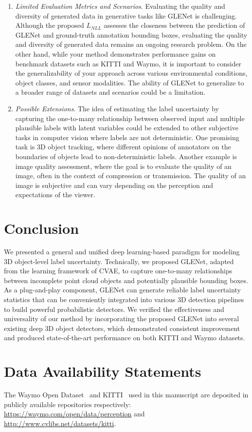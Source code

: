 \documentclass[twocolumn]{svjour3}
\begin{document}
{\begin{enumerate}[label=(\arabic*)]
	\item \textit{Limited Evaluation Metrics and Scenarios}. 
	Evaluating the quality and diversity of generated data in generative tasks like GLENet is challenging. 
Although the proposed $L_{NLL}$ assesses the closeness between the prediction of GLENet and ground-truth annotation bounding boxes, evaluating the quality and diversity of generated data remains an ongoing research problem.
	On the other hand, while your method demonstrates performance gains on benchmark datasets such as KITTI and Waymo, it is important to consider the generalizability of your approach across various environmental conditions, object classes, and sensor modalities. The ability of GLENet to generalize to a broader range of datasets and scenarios could be a limitation.
	\item \textit{Possible Extensions}. The idea of estimating the label uncertainty by capturing the one-to-many relationship between observed input and multiple plausible labels with latent variables could be extended to other subjective tasks in computer vision where labels are not deterministic. One promising task is 3D object tracking, where different opinions of annotators on the boundaries of objects lead to non-deterministic labels. Another example is image quality assessment, where the goal is to evaluate the quality of an image, often in the context of compression or transmission. The quality of an image is subjective and can vary depending on the perception and expectations of the viewer.
\end{enumerate}
}


\section{Conclusion} 
\label{sec:con}
We presented a general and unified deep learning-based paradigm for modeling 3D object-level label uncertainty. Technically, we proposed GLENet, adapted from the learning framework of CVAE, to capture one-to-many relationships between incomplete point cloud objects and potentially plausible bounding boxes. As a plug-and-play component, GLENet can generate reliable label uncertainty statistics that can be conveniently integrated into various 3D detection pipelines to build powerful probabilistic detectors. We verified the effectiveness and universality of our method by incorporating the proposed GLENet into several existing deep 3D object detectors, which demonstrated consistent improvement and produced state-of-the-art performance on both KITTI and Waymo datasets.

\section*{Data Availability Statements}
The Waymo Open Dataset~\citep{Sun_2020_CVPR} and KITTI~\citep{Geiger_KITTI} used in this manuscript are deposited in publicly available repositories respectively: \url{https://waymo.com/open/data/perception} and \url{http://www.cvlibs.net/datasets/kitti}.


   
\end{document}
